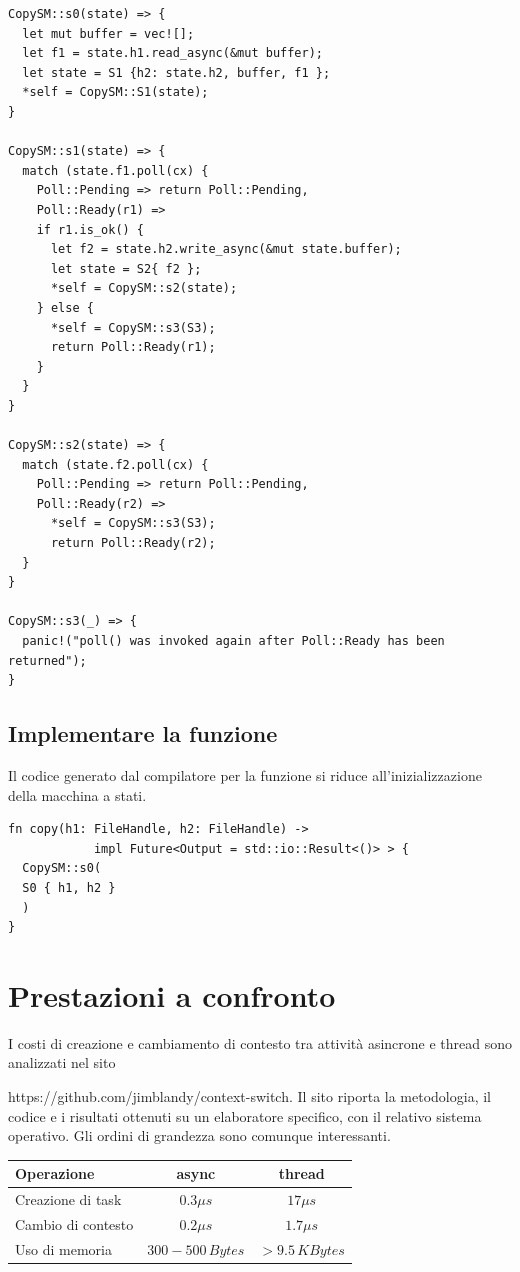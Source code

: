 \begin{verbatim}
CopySM::s0(state) => {
  let mut buffer = vec![];
  let f1 = state.h1.read_async(&mut buffer);
  let state = S1 {h2: state.h2, buffer, f1 };
  *self = CopySM::S1(state);
}

CopySM::s1(state) => {
  match (state.f1.poll(cx) {
    Poll::Pending => return Poll::Pending,
    Poll::Ready(r1) =>
    if r1.is_ok() {
      let f2 = state.h2.write_async(&mut state.buffer);
      let state = S2{ f2 };
      *self = CopySM::s2(state);
    } else {
      *self = CopySM::s3(S3);
      return Poll::Ready(r1);
    }
  }
}

CopySM::s2(state) => {
  match (state.f2.poll(cx) {
    Poll::Pending => return Poll::Pending,
    Poll::Ready(r2) =>
      *self = CopySM::s3(S3);
      return Poll::Ready(r2);
  }
}

CopySM::s3(_) => {
  panic!("poll() was invoked again after Poll::Ready has been returned");
}
\end{verbatim}


\subsection{Implementare la funzione}

Il codice generato dal compilatore per la funzione si riduce
all'inizializzazione della macchina a stati.

\begin{verbatim}
fn copy(h1: FileHandle, h2: FileHandle) ->
            impl Future<Output = std::io::Result<()> > {
  CopySM::s0(
  S0 { h1, h2 }
  )
}
\end{verbatim}


\section{Prestazioni a confronto}

I costi di creazione e cambiamento di contesto tra attività asincrone e thread sono
analizzati nel sito

https://github.com/jimblandy/context-switch.
Il sito riporta la metodologia, il codice e i risultati ottenuti su un elaboratore
specifico, con il relativo sistema operativo. Gli ordini di grandezza sono comunque interessanti.

\begin{table}[h!]
  \renewcommand{\arraystretch}{1.5}
  \centering
  \begin{tabular}{l c c}
    \toprule
    \textbf{Operazione} & \textbf{async}   & \textbf{thread} \\
    \midrule
    Creazione di task   & $0.3 \mu s$      & $17 \mu s$      \\
    Cambio di contesto  & $0.2 \mu s$      & $1.7 \mu s$     \\
    Uso di memoria      & $300-500\,Bytes$ & $>9.5\,KBytes$  \\
    \bottomrule
  \end{tabular}
\end{table}

